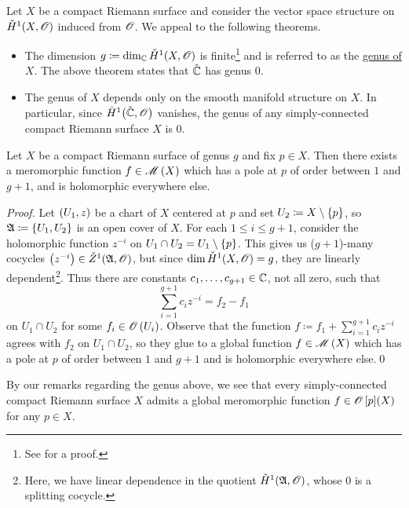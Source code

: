 \documentclass[../Moduli_Spaces_of_Riemann_Surfaces.tex]{subfiles}
\begin{document}
    \begin{remark}
        Let $X$ be a compact Riemann surface and consider the vector space structure on $\check{H}^1\!\left(X,\mathscr{O}\right)$ induced from $\mathscr{O}$. We appeal to the following theorems.
        \begin{itemize}
            \item The dimension $g\coloneqq\dim_{\mathbb{C}}\check{H}^1\!\left(X,\mathscr{O}\right)$ is finite\footnote{See \cite[][Section 14]{forster} for a proof.} and is referred to as the \ul{genus of $X$}. The above theorem states that $\hat{\mathbb{C}}$ has genus $0$.
                \vspace{-0.05in}
            \item The genus of $X$ depends only on the smooth manifold structure on $X$. In particular, since $\check{H}^1\big(\hat{\mathbb{C}},\mathscr{O}\big)$ vanishes, the genus of any simply-connected compact Riemann surface $X$ is $0$.\exqed
        \end{itemize}
    \end{remark}
    \begin{corollary}\label{CC:cor:global_meromorphic_functions}
        Let $X$ be a compact Riemann surface of genus $g$ and fix $p\in X$. Then there exists a meromorphic function $f\in\mathscr{M}\left(X\right)$ which has a pole at $p$ of order between $1$ and $g+1$, and is holomorphic everywhere else.
    \end{corollary}
    \begin{proof}
        Let $\left(U_1,z\right)$ be a chart of $X$ centered at $p$ and set $U_2\coloneqq X\setminus\left\{p\right\}$, so $\mathfrak{A}\coloneqq\left\{U_1,U_2\right\}$ is an open cover of $X$. For each $1\leq i\leq g+1$, consider the holomorphic function $z^{-i}$ on $U_1\cap U_2=U_1\setminus\left\{p\right\}$. This gives us ($g+1$)-many cocycles $\left(z^{-i}\right)\in\check{Z}^1\!\left(\mathfrak{A},\mathscr{O}\right)$, but since $\dim\check{H}^1\!\left(X,\mathscr{O}\right)=g$, they are linearly dependent\footnote{Here, we have linear dependence in the quotient $\check{H}^1\!\left(\mathfrak{A},\mathscr{O}\right)$, whose $0$ is a splitting cocycle.}. Thus there are constants $c_1,\dots,c_{g+1}\in\mathbb{C}$, not all zero, such that
        \begin{equation*}
            \sum_{i=1}^{g+1}c_iz^{-i}=f_2-f_1
        \end{equation*}
        on $U_1\cap U_2$ for some $f_i\in\mathscr{O}\left(U_i\right)$. Observe that the function $f\coloneqq f_1+\sum_{i=1}^{g+1}c_iz^{-i}$ agrees with $f_2$ on $U_1\cap U_2$, so they glue to a global function $f\in\mathscr{M}\left(X\right)$ which has a pole at $p$ of order between $1$ and $g+1$ and is holomorphic everywhere else.\qed
    \end{proof}
    \begin{remark}
        By our remarks regarding the genus above, we see that every simply-connected compact Riemann surface $X$ admits a global meromorphic function $f\in\mathscr{O}\left[p\right]\!\left(X\right)$ for any $p\in X$.\exqed
    \end{remark}
\end{document}
